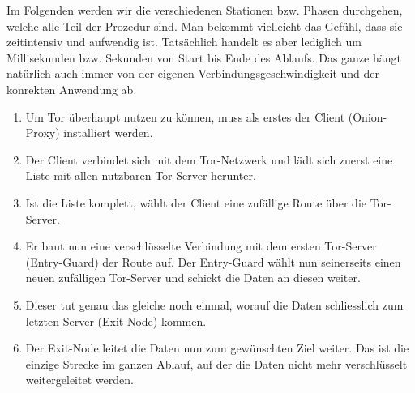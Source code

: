 Im Folgenden werden wir die verschiedenen Stationen bzw. Phasen durchgehen, welche alle Teil der Prozedur sind. Man bekommt vielleicht das Gefühl, dass sie zeitintensiv und aufwendig ist. Tatsächlich handelt es aber lediglich um Millisekunden bzw. Sekunden von Start bis Ende des Ablaufs. Das ganze hängt natürlich auch immer von der eigenen Verbindungsgeschwindigkeit und der konrekten Anwendung ab.

\begin{enumerate}
\item Um Tor überhaupt nutzen zu können, muss als erstes der  Client (Onion-Proxy) installiert werden.
\item Der Client verbindet sich mit dem Tor-Netzwerk und lädt sich zuerst eine Liste mit allen nutzbaren Tor-Server herunter.
\item Ist die Liste komplett, wählt der Client eine zufällige Route über die Tor-Server.
\item Er baut nun eine verschlüsselte Verbindung mit dem ersten Tor-Server (Entry-Guard) der Route auf. Der Entry-Guard wählt nun seinerseits einen neuen zufälligen Tor-Server und schickt die Daten an diesen weiter.
\item Dieser tut genau das gleiche noch einmal, worauf die Daten schliesslich zum letzten Server (Exit-Node) kommen.
\item Der Exit-Node leitet die Daten nun zum gewünschten Ziel weiter. Das ist die einzige Strecke im ganzen Ablauf, auf der die Daten nicht mehr verschlüsselt weitergeleitet werden.
\end{enumerate}

